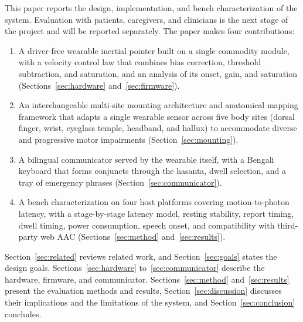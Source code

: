 \documentclass[journal]{IEEEtran}
\begin{document}
This paper reports the design, implementation, and bench characterization of the system. Evaluation with patients, caregivers, and clinicians is the next stage of the project and will be reported separately. The paper makes four contributions:
\begin{enumerate}
\item A driver-free wearable inertial pointer built on a single commodity module, with a velocity control law that combines bias correction, threshold subtraction, and saturation, and an analysis of its onset, gain, and saturation (Sections~\ref{sec:hardware} and~\ref{sec:firmware}).
\item An interchangeable multi-site mounting architecture and anatomical mapping framework that adapts a single wearable sensor across five body sites (dorsal finger, wrist, eyeglass temple, headband, and hallux) to accommodate diverse and progressive motor impairments (Section~\ref{sec:mounting}).
\item A bilingual communicator served by the wearable itself, with a Bengali keyboard that forms conjuncts through the hasanta, dwell selection, and a tray of emergency phrases (Section~\ref{sec:communicator}).
\item A bench characterization on four host platforms covering motion-to-photon latency, with a stage-by-stage latency model, resting stability, report timing, dwell timing, power consumption, speech onset, and compatibility with third-party web AAC (Sections~\ref{sec:method} and~\ref{sec:results}).
\end{enumerate}

Section~\ref{sec:related} reviews related work, and Section~\ref{sec:goals} states the design goals. Sections~\ref{sec:hardware} to~\ref{sec:communicator} describe the hardware, firmware, and communicator. Sections~\ref{sec:method} and~\ref{sec:results} present the evaluation methods and results, Section~\ref{sec:discussion} discusses their implications and the limitations of the system, and Section~\ref{sec:conclusion} concludes.
\end{document}
